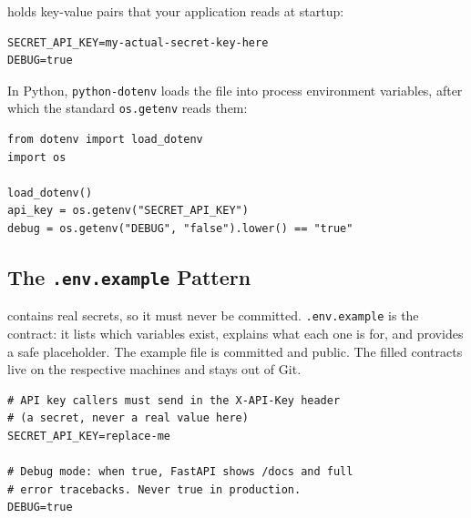 
 holds key-value pairs that your application
reads at startup:

\begin{verbatim}
SECRET_API_KEY=my-actual-secret-key-here
DEBUG=true
\end{verbatim}

In Python, \texttt{python-dotenv} loads the file into
process environment variables, after which the standard
\texttt{os.getenv} reads them:

\begin{verbatim}
from dotenv import load_dotenv
import os

load_dotenv()
api_key = os.getenv("SECRET_API_KEY")
debug = os.getenv("DEBUG", "false").lower() == "true"
\end{verbatim}


\subsection{The \texttt{.env.example} Pattern}

 contains real secrets, so it must never
be committed.
\texttt{.env.example} is the contract: it lists which variables exist,
explains what each one is for, and provides a safe placeholder.
The example file is committed and public.
The filled contracts live on the respective machines and stays out of Git.

\begin{verbatim}
# API key callers must send in the X-API-Key header
# (a secret, never a real value here)
SECRET_API_KEY=replace-me

# Debug mode: when true, FastAPI shows /docs and full
# error tracebacks. Never true in production.
DEBUG=true
\end{verbatim}


